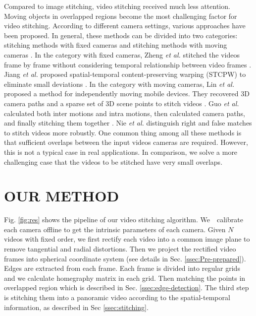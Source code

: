 \documentclass[conference]{IEEEtran}
\begin{document}
 Compared to image stitching, video stitching received much less attention. 
Moving objects in overlapped regions become the most challenging factor for video stitching.
%
According to different camera settings, various approaches have been proposed. In general, these methods can be divided into two categories: 
stitching methods with fixed cameras \cite{zheng2008stitching, he2010panoramic, Jiang_2015_CVPR_Workshops, perazzi2015panoramic, li2015efficient} 
and stitching methods with moving cameras \cite{lin2016seamless, guo2016joint, nie2018dynamic}. 
%
In the category with fixed cameras, Zheng \textit{et al.} stitched the videos frame by frame without considering temporal relationship between video frames \cite{zheng2008stitching}.
Jiang \textit{et al.} proposed spatial-temporal content-preserving warping (STCPW) to eliminate small deviations \cite{Jiang_2015_CVPR_Workshops}.
In the category with moving cameras, 
Lin \textit{et al.} proposed a method for independently moving mobile devices.
They recovered 3D camera paths and a sparse set of 3D scene points to stitch videos \cite{lin2016seamless}.
Guo \textit{et al.} calculated both inter
motions and intra motions, then calculated camera paths, and finally stitching them together \cite{guo2016joint}.
Nie \textit{et al.} distinguish right and false matches \cite{nie2018dynamic} to stitch videos more robustly. 
One common thing among all these methods is that sufficient overlaps between the input videos cameras are required. 
However, this is not a typical case in real applications. 
In comparison, we solve a more challenging case that the videos to be stitched have very small overlaps.

\section{OUR METHOD}
\label{sec:ourmethod}

Fig. \ref{fig:res} shows the pipeline of our video stitching algorithm.
We　calibrate each camera offline to get the intrinsic parameters of each camera. 
Given $N$ videos with fixed order, we first rectify each video into a common image plane to remove tangential and radial distortions.
Then we project the rectified video frames into spherical coordinate system (see details in Sec. \ref{ssec:Pre-prepared}). 
Edges are extracted from each frame.
Each frame is divided into regular grids and we calculate homegraphy matrix in each grid. 
Then matching the points in overlapped region which is described in Sec. \ref{ssec:edge-detection}. 
The third step is stitching them into a panoramic video according to the spatial-temporal information, as described in Sec \ref{ssec:stitching}.
\end{document}
